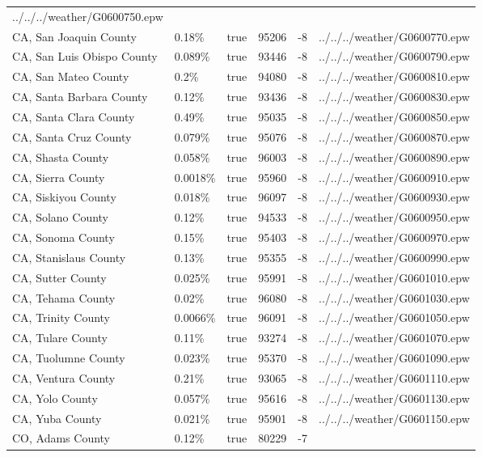 \begin{longtable}[]{@{}llllll@{}}
../../../weather/G0600750.epw \\
CA, San Joaquin County & 0.18\% & true & 95206 & -8 &
../../../weather/G0600770.epw \\
CA, San Luis Obispo County & 0.089\% & true & 93446 & -8 &
../../../weather/G0600790.epw \\
CA, San Mateo County & 0.2\% & true & 94080 & -8 &
../../../weather/G0600810.epw \\
CA, Santa Barbara County & 0.12\% & true & 93436 & -8 &
../../../weather/G0600830.epw \\
CA, Santa Clara County & 0.49\% & true & 95035 & -8 &
../../../weather/G0600850.epw \\
CA, Santa Cruz County & 0.079\% & true & 95076 & -8 &
../../../weather/G0600870.epw \\
CA, Shasta County & 0.058\% & true & 96003 & -8 &
../../../weather/G0600890.epw \\
CA, Sierra County & 0.0018\% & true & 95960 & -8 &
../../../weather/G0600910.epw \\
CA, Siskiyou County & 0.018\% & true & 96097 & -8 &
../../../weather/G0600930.epw \\
CA, Solano County & 0.12\% & true & 94533 & -8 &
../../../weather/G0600950.epw \\
CA, Sonoma County & 0.15\% & true & 95403 & -8 &
../../../weather/G0600970.epw \\
CA, Stanislaus County & 0.13\% & true & 95355 & -8 &
../../../weather/G0600990.epw \\
CA, Sutter County & 0.025\% & true & 95991 & -8 &
../../../weather/G0601010.epw \\
CA, Tehama County & 0.02\% & true & 96080 & -8 &
../../../weather/G0601030.epw \\
CA, Trinity County & 0.0066\% & true & 96091 & -8 &
../../../weather/G0601050.epw \\
CA, Tulare County & 0.11\% & true & 93274 & -8 &
../../../weather/G0601070.epw \\
CA, Tuolumne County & 0.023\% & true & 95370 & -8 &
../../../weather/G0601090.epw \\
CA, Ventura County & 0.21\% & true & 93065 & -8 &
../../../weather/G0601110.epw \\
CA, Yolo County & 0.057\% & true & 95616 & -8 &
../../../weather/G0601130.epw \\
CA, Yuba County & 0.021\% & true & 95901 & -8 &
../../../weather/G0601150.epw \\
CO, Adams County & 0.12\% & true & 80229 & -7 &

\end{longtable}
